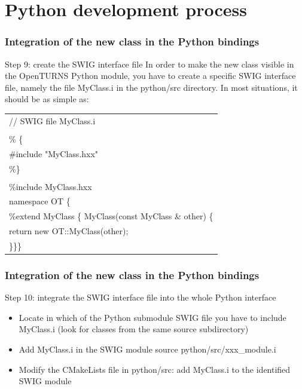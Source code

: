 \documentclass[8pt]{beamer}
\begin{document}
\section[Python development process]{Python development process}
\begin{frame}
  \frametitle{Integration of the new class in the Python bindings}
  \begin{block}{Step 9: create the SWIG interface file}
    In order to make the new class visible in the OpenTURNS Python module, you have to create a specific SWIG interface file, namely the file MyClass.i in the python/src directory. In most situations, it should be as simple as:
    \small
    \begin{tabular}{l}
      \ttfamily // SWIG file MyClass.i \\
      \ttfamily  \\
      \ttfamily \% \{ \\
      \ttfamily \#include "MyClass.hxx" \\
      \ttfamily \%\} \\
      \ttfamily  \\
      \ttfamily \%include MyClass.hxx \\
      \ttfamily namespace OT \{ \\
      \ttfamily \%extend MyClass \{ MyClass(const MyClass \& other) \{ \\
      \ttfamily return new OT::MyClass(other); \\
      \ttfamily \}\}\}
    \end{tabular}
    \normalsize
  \end{block}
\end{frame}
\begin{frame}
  \frametitle{Integration of the new class in the Python bindings}
  \begin{block}{Step 10: integrate the SWIG interface file into the whole Python interface}
    \begin{itemize}
    \item Locate in which of the Python submodule SWIG file you have to include MyClass.i (look for classes from the same source subdirectory) 
    \item Add MyClass.i in the SWIG module source python/src/xxx\_module.i
    \item Modify the CMakeLists file in python/src: add MyClass.i to the identified SWIG module
    \end{itemize}
  \end{block}
\end{frame}
\end{document}
